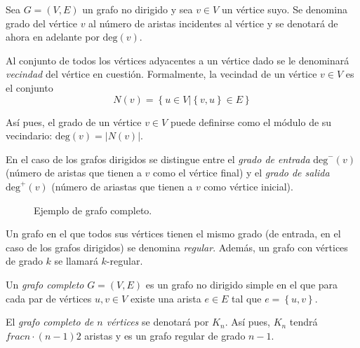\begin{definition}
Sea $G=(V,E)$ un grafo no dirigido y sea $v \in V$ un vértice suyo. Se denomina grado del vértice $v$ al número de aristas incidentes al vértice y se denotará de ahora en adelante por $\text{deg}(v)$.

Al conjunto de todos los vértices adyacentes a un vértice dado se le denominará \emph{vecindad} del vértice en cuestión. Formalmente, la vecindad de un vértice $v \in V$ es el conjunto
\begin{equation}
N(v) = \left\lbrace u \in V | \left\lbrace v,u\right\rbrace \in E \right\rbrace
\end{equation}

Así pues, el grado de un vértice $v \in V$ puede definirse como el módulo de su vecindario: $\text{deg}(v) = |N(v)|$.

En el caso de los grafos dirigidos se distingue entre el \emph{grado de entrada} $\text{deg}^-(v)$ (número de aristas que tienen a $v$ como el vértice final) y el \emph{grado de salida} $\text{deg}^+(v)$ (número de ariastas que tienen a $v$ como vértice inicial). 
\end{definition}


\begin{figure}[H]
\centering
{}
\caption{Ejemplo de grafo completo.}
	\label{fig:grafo5}
\end{figure}

\begin{definition}
Un grafo en el que todos sus vértices tienen el mismo grado (de entrada, en el caso de los grafos dirigidos) se denomina \emph{regular}. Además, un grafo con vértices de grado $k$ se llamará $k$-regular.
\end{definition}

\begin{definition}
Un \emph{grafo completo} $G=(V,E)$ es un grafo no dirigido simple en el que para cada par de vértices $u, v\in V$ existe una arista $e \in E$ tal que $e = \left\lbrace u,v\right\rbrace$.

El \emph{grafo completo de $n$ vértices} se denotará por $K_n$. Así pues, $K_n$ tendrá $frac{n\cdot (n-1)}{2}$ aristas y es un grafo regular de grado $n-1$.
\end{definition}

